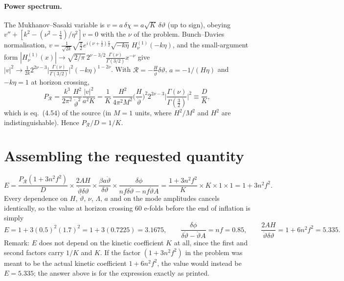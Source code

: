 \documentclass[11pt]{article}
\begin{document}
\paragraph{Power spectrum.} The Mukhanov--Sasaki variable is $v=a\,\delta\chi=a\sqrt K\,\delta\vartheta$ (up to sign), obeying $v''+[k^2-(\nu^2-\frac14)/\eta^2]v=0$ with the $\nu$ of the problem. Bunch--Davies normalisation, $v=\frac{1}{\sqrt{2k}}\sqrt{\frac\pi2}e^{i(\nu+\frac12)\frac\pi2}\sqrt{-k\eta}\,H^{(1)}_\nu(-k\eta)$, and the small-argument form $|H^{(1)}_\nu(x)|\to\sqrt{2/\pi}\,2^{\nu-3/2}\frac{\Gamma(\nu)}{\Gamma(3/2)}x^{-\nu}$ give $|v|^2\to\frac{1}{2k}2^{2\nu-3}\big|\frac{\Gamma(\nu)}{\Gamma(3/2)}\big|^2(-k\eta)^{1-2\nu}$. With $\mathcal R=-\frac{H}{\dot\vartheta}\delta\vartheta$, $a=-1/(H\eta)$ and $-k\eta=1$ at horizon crossing,
\begin{equation}
P_{\mathcal R}=\frac{k^3}{2\pi^2}\frac{H^2}{\dot\vartheta^2}\frac{|v|^2}{a^2K}
=\frac1K\,\frac{H^2}{4\pi^2M^2}\Big(\frac{H}{\dot\vartheta}\Big)^2 2^{2\nu-3}\Big|\frac{\Gamma(\nu)}{\Gamma(\frac32)}\Big|^2\equiv\frac{D}{K},
\end{equation}
which is eq.\ (4.54) of the source (in $M=1$ units, where $H^2/M^2$ and $H^2$ are indistinguishable). Hence $P_{\mathcal R}/D=1/K$.

\section{Assembling the requested quantity}
\begin{equation}
E=\frac{P_{\mathcal R}(1+3n^2f^2)}{D}\times\frac{2AH}{\dot\vartheta\delta\vartheta}\times\frac{\beta a\dot\vartheta}{\delta\vartheta}\times\frac{\delta\phi}{nf\delta\dot\vartheta-nf\dot\vartheta A}
=\frac{1+3n^2f^2}{K}\times K\times1\times1=1+3n^2f^2 .
\end{equation}
Every dependence on $H$, $\dot\vartheta$, $\nu$, $\Lambda$, $a$ and on the mode amplitudes cancels identically, so the value at horizon crossing 60 e-folds before the end of inflation is simply
\begin{equation}
\boxed{E=1+3(0.5)^2(1.7)^2=1+3(0.7225)=3.1675},\qquad
\boxed{\frac{\delta\phi}{\delta\dot\vartheta-\dot\vartheta A}=nf=0.85},\qquad
\boxed{\frac{2AH}{\dot\vartheta\delta\vartheta}=1+6n^2f^2=5.335}.
\end{equation}
Remark: $E$ does not depend on the kinetic coefficient $K$ at all, since the first and second factors carry $1/K$ and $K$. If the factor $(1+3n^2f^2)$ in the problem was meant to be the actual kinetic coefficient $1+6n^2f^2$, the value would instead be $E=5.335$; the answer above is for the expression exactly as printed.
\end{document}
